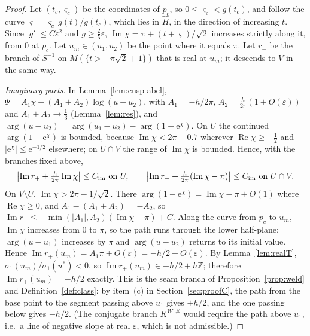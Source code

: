 \documentclass[11pt]{amsart}
\theoremstyle{definition}
\newcommand{\Kk}{K}
\newcommand{\eee}{\mathrm{e}}
\begin{document}
\begin{proof}
Let $(t_c,\varsigma_c)$ be the coordinates of $p_c$, so $0\le\varsigma_c<g(t_c)$, and
follow the curve $\varsigma=\varsigma_c\,g(t)/g(t_c)$, which lies in $\hat H$, in the direction
of increasing $t$.  Since $|g'|\le C\varepsilon^2$ and $g\ge\tfrac25\varepsilon$,
$\operatorname{Im}\chi=\pi+(t+\varsigma)/\sqrt2$ increases strictly along it, from $0$ at $p_c$.
Let $u_m\in(u_1,u_2)$ be the point where it equals $\pi$.  Let $r_-$ be the branch
of $S^{-1}$ on $M(\{t>-\pi\sqrt2+1\})$ that is real at $u_m$; it descends to $V$
in the same way.

\emph{Imaginary parts.}  In Lemma~\ref{lem:cusp-abel},
$\Psi=A_1\chi+(A_1+A_2)\log(u-u_2)$, with $A_1=-h/2\pi$,
$A_2=\tfrac h{2\pi}(1+O(\varepsilon))$ and $A_1+A_2\to\tfrac13$ (Lemma~\ref{lem:res}), and
$\arg(u-u_2)=\arg(u_1-u_2)-\arg(1-\eee^\chi)$.  On $U$ the continued
$\arg(1-\eee^\chi)$ is bounded, because $\operatorname{Im}\chi<2\pi-0.7$ wherever
$\operatorname{Re}\chi\ge-\tfrac12$ and $|\eee^\chi|\le\eee^{-1/2}$ elsewhere; on $U\cap V$ the range of
$\operatorname{Im}\chi$ is bounded.  Hence, with the branches fixed above,
\begin{equation}\label{eq:cusp-im}
 \bigl|\operatorname{Im}r_++\tfrac h{2\pi}\operatorname{Im}\chi\bigr|\le C_{\rm im}\ \text{on }U,\qquad
 \bigl|\operatorname{Im}r_-+\tfrac h{2\pi}(\operatorname{Im}\chi-\pi)\bigr|\le C_{\rm im}\ \text{on }U\cap V .
\end{equation}
On $V\setminus U$, $\operatorname{Im}\chi>2\pi-1/\sqrt2$.  There
$\arg(1-\eee^\chi)=\operatorname{Im}\chi-\pi+O(1)$ where $\operatorname{Re}\chi\ge0$, and
$A_1-(A_1+A_2)=-A_2$, so $\operatorname{Im}r_-\le-\min(|A_1|,A_2)(\operatorname{Im}\chi-\pi)+C$.  Along the
curve from $p_c$ to $u_m$, $\operatorname{Im}\chi$ increases from $0$ to $\pi$, so the path runs
through the lower half-plane: $\arg(u-u_1)$ increases by $\pi$ and
$\arg(u-u_2)$ returns to its initial value.  Hence
$\operatorname{Im}r_+(u_m)=A_1\pi+O(\varepsilon)=-h/2+O(\varepsilon)$.  By
Lemma~\ref{lem:realT}, $\sigma_1(u_m)/\sigma_1(u^*)<0$, so
$\operatorname{Im}r_+(u_m)\in-h/2+h\mathbb Z$; therefore $\operatorname{Im}r_+(u_m)=-h/2$ exactly.  This is
the seam branch of Proposition~\ref{prop:weld} and Definition~\ref{def:class}: by
item~(c) in Section~\ref{sec:proofC}, the path from the base point to the
segment passing above $u_1$ gives $+h/2$, and the one passing below gives
$-h/2$.  (The conjugate branch $\Kk^{W,\#}$ would require the path above $u_1$,
i.e.\ a line of negative slope at real $\varepsilon$, which is not admissible.)


\end{proof}
\end{document}
